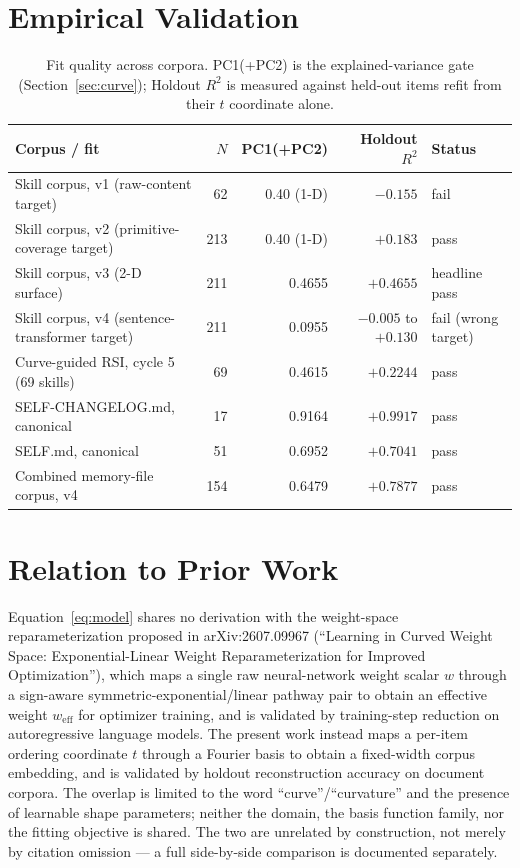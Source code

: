 \documentclass[11pt]{article}
\begin{document}
\section{Empirical Validation}
\label{sec:results}

\begin{table}[h]
\centering
\begin{tabular}{@{}lrrrl@{}}
\toprule
Corpus / fit & $N$ & PC1(+PC2) & Holdout $R^2$ & Status \\
\midrule
Skill corpus, v1 (raw-content target) & 62 & 0.40 (1-D) & $-0.155$ & fail \\
Skill corpus, v2 (primitive-coverage target) & 213 & 0.40 (1-D) & $+0.183$ & pass \\
Skill corpus, v3 (2-D surface) & 211 & 0.4655 & $+0.4655$ & headline pass \\
Skill corpus, v4 (sentence-transformer target) & 211 & 0.0955 & $-0.005$ to $+0.130$ & fail (wrong target) \\
Curve-guided RSI, cycle 5 (69 skills) & 69 & 0.4615 & $+0.2244$ & pass \\
SELF-CHANGELOG.md, canonical & 17 & 0.9164 & $+0.9917$ & pass \\
SELF.md, canonical & 51 & 0.6952 & $+0.7041$ & pass \\
Combined memory-file corpus, v4 & 154 & 0.6479 & $+0.7877$ & pass \\
\bottomrule
\end{tabular}
\caption{Fit quality across corpora. PC1(+PC2) is the explained-variance
gate (Section~\ref{sec:curve}); Holdout $R^2$ is measured against held-out
items refit from their $t$ coordinate alone.}
\label{tab:results}
\end{table}

\section{Relation to Prior Work}

Equation~\ref{eq:model} shares no derivation with the weight-space
reparameterization proposed in arXiv:2607.09967 (``Learning in Curved Weight
Space: Exponential-Linear Weight Reparameterization for Improved
Optimization''), which maps a single raw neural-network weight scalar $w$
through a sign-aware symmetric-exponential/linear pathway pair to obtain an
effective weight $w_{\mathrm{eff}}$ for optimizer training, and is validated
by training-step reduction on autoregressive language models. The present
work instead maps a per-item ordering coordinate $t$ through a Fourier
basis to obtain a fixed-width corpus embedding, and is validated by holdout
reconstruction accuracy on document corpora. The overlap is limited to the
word ``curve''/``curvature'' and the presence of learnable shape parameters;
neither the domain, the basis function family, nor the fitting objective is
shared. The two are unrelated by construction, not merely by citation
omission --- a full side-by-side comparison is documented separately.
\end{document}
